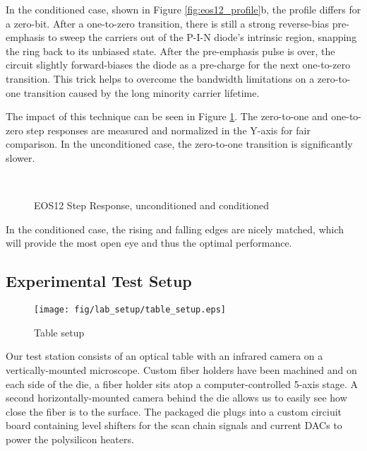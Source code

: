 In the conditioned case, shown in Figure \ref{fig:eos12_profile}b, the profile differs for a zero-bit.  After a one-to-zero transition, there is still a strong reverse-bias pre-emphasis to sweep the carriers out of the P-I-N diode's intrinsic region, snapping the ring back to its unbiased state.  After the pre-emphasis pulse is over, the circuit slightly forward-biases the diode as a pre-charge for the next one-to-zero transition.  This trick helps to overcome the bandwidth limitations on a zero-to-one transition caused by the long minority carrier lifetime.

The impact of this technique can be seen in Figure \ref{fig:eos12_step_response}.  The zero-to-one and one-to-zero step responses are measured and normalized in the Y-axis for fair comparison.  In the unconditioned case, the zero-to-one transition is significantly slower.  
	\begin{figure}[H]
		\begin{center}
			\\
		\end{center}
		\caption{\label{fig:eos12_step_response}EOS12 Step Response, unconditioned and conditioned}
	\end{figure}


In the conditioned case, the rising and falling edges are nicely matched, which will provide the most open eye and thus the optimal performance.



\subsection{Experimental Test Setup}


	\begin{figure}[ht]
		\begin{center}
			\texttt{[image: fig/lab\_setup/table\_setup.eps]}
			\caption{\label{fig:table_setup}Table setup}
		\end{center}
	\end{figure}

	Our test station consists of an optical table with an infrared camera on a vertically-mounted microscope.   Custom fiber holders have been machined and on each side of the die, a fiber holder sits atop a computer-controlled 5-axis stage.  A second horizontally-mounted camera behind the die allows us to easily see how close the fiber is to the surface.  The packaged die plugs into a custom circiuit board containing level shifters for the scan chain signals and current DACs to power the polysilicon heaters.  %


